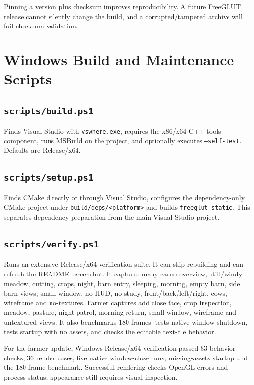 \documentclass[11pt,a4paper,openany]{book}
\newcommand{\code}[1]{\texttt{#1}}
\newcommand{\file}[1]{\nolinkurl{#1}}
\begin{document}
\begin{whybox}
	Pinning a version plus checksum improves reproducibility. A future FreeGLUT release cannot silently change the build, and a corrupted/tampered archive will fail checksum validation.
\end{whybox}

\chapter{Windows Build and Maintenance Scripts}
\section{\texttt{scripts/build.ps1}}
Finds Visual Studio with \code{vswhere.exe}, requires the x86/x64 C++ tools component, runs MSBuild on the project, and optionally executes \code{--self-test}. Defaults are Release/x64.

\section{\texttt{scripts/setup.ps1}}
Finds CMake directly or through Visual Studio, configures the dependency-only CMake project under \file{build/deps/<platform>} and builds \code{freeglut\_static}. This separates dependency preparation from the main Visual Studio project.

\section{\texttt{scripts/verify.ps1}}
Runs an extensive Release/x64 verification suite. It can skip rebuilding and can refresh the README screenshot. It captures many cases: overview, still/windy meadow, cutting, crops, night, barn entry, sleeping, morning, empty barn, side barn views, small window, no-HUD, no-study, front/back/left/right, cows, wireframe and no-textures. Farmer captures add close face, crop inspection, meadow, pasture, night patrol, morning return, small-window, wireframe and untextured views. It also benchmarks 180 frames, tests native window shutdown, tests startup with no assets, and checks the editable text-file behavior.

For the farmer update, Windows Release/x64 verification passed 83 behavior checks, 36 render cases, five native window-close runs, missing-assets startup and the 180-frame benchmark. Successful rendering checks OpenGL errors and process status; appearance still requires visual inspection.
\end{document}
